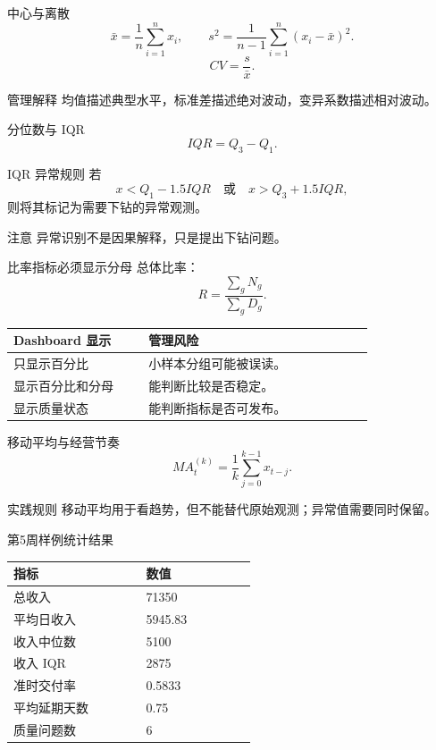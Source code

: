 \documentclass[UTF8,fontset=fandol,aspectratio=169,11pt]{ctexbeamer}
\begin{document}
\begin{frame}{中心与离散}
\[
\bar x=\frac{1}{n}\sum_{i=1}^{n}x_i,
\qquad
s^2=\frac{1}{n-1}\sum_{i=1}^{n}(x_i-\bar x)^2.
\]
\[
CV=\frac{s}{\bar x}.
\]

\begin{block}{管理解释}
均值描述典型水平，标准差描述绝对波动，变异系数描述相对波动。
\end{block}
\end{frame}

\begin{frame}{分位数与 IQR}
\[
IQR=Q_3-Q_1.
\]

\begin{block}{IQR 异常规则}
若
\[
x<Q_1-1.5IQR
\quad \text{或}\quad
x>Q_3+1.5IQR,
\]
则将其标记为需要下钻的异常观测。
\end{block}

\begin{alertblock}{注意}
异常识别不是因果解释，只是提出下钻问题。
\end{alertblock}
\end{frame}

\begin{frame}{比率指标必须显示分母}
总体比率：
\[
R=\frac{\sum_g N_g}{\sum_g D_g}.
\]

\begin{table}
\small
\centering
\begin{tabular}{p{0.30\linewidth}p{0.50\linewidth}}
\toprule
Dashboard 显示 & 管理风险\\
\midrule
只显示百分比 & 小样本分组可能被误读。\\
显示百分比和分母 & 能判断比较是否稳定。\\
显示质量状态 & 能判断指标是否可发布。\\
\bottomrule
\end{tabular}
\end{table}
\end{frame}

\begin{frame}{移动平均与经营节奏}
\[
MA_t^{(k)}=\frac{1}{k}\sum_{j=0}^{k-1}x_{t-j}.
\]

\begin{block}{实践规则}
移动平均用于看趋势，但不能替代原始观测；异常值需要同时保留。
\end{block}
\end{frame}

\begin{frame}{第5周样例统计结果}
\begin{table}
\small
\centering
\begin{tabular}{p{0.36\linewidth}p{0.30\linewidth}}
\toprule
指标 & 数值\\
\midrule
总收入 & 71350\\
平均日收入 & 5945.83\\
收入中位数 & 5100\\
收入 IQR & 2875\\
准时交付率 & 0.5833\\
平均延期天数 & 0.75\\
质量问题数 & 6\\
\bottomrule
\end{tabular}
\end{table}
\end{frame}
\end{document}
